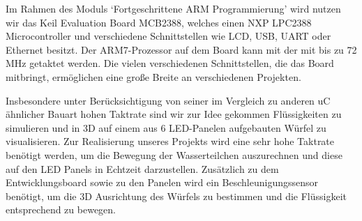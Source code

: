 Im Rahmen des Moduls `Fortgeschrittene ARM Programmierung' wird nutzen wir das Keil Evaluation Board MCB2388, welches einen NXP LPC2388 Microcontroller und verschiedene Schnittstellen wie LCD, USB, UART oder Ethernet besitzt. Der ARM7-Prozessor auf dem Board kann mit der mit bis zu 72 MHz getaktet werden. Die vielen verschiedenen Schnittstellen, die das Board mitbringt, ermöglichen eine große Breite an verschiedenen Projekten.

Insbesondere unter Berücksichtigung von seiner im Vergleich zu anderen uC ähnlicher Bauart hohen Taktrate sind wir zur Idee gekommen Flüssigkeiten zu simulieren und in 3D auf einem aus 6 LED-Panelen aufgebauten Würfel zu visualisieren. Zur Realisierung unseres Projekts wird eine sehr hohe Taktrate benötigt werden, um die Bewegung der Wasserteilchen auszurechnen und diese auf den LED Panels in Echtzeit darzustellen. Zusätzlich zu dem Entwicklungsboard sowie zu den Panelen wird ein Beschleunigungssensor benötigt, um die 3D Ausrichtung des Würfels zu bestimmen und die Flüssigkeit entsprechend zu bewegen.

